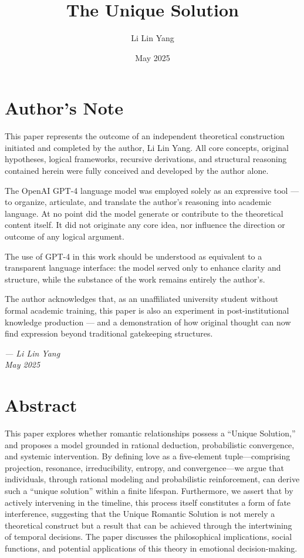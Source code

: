 \documentclass[12pt]{article}
\begin{document}
\title{The Unique Solution}
\author{Li Lin Yang}
\date{May 2025}
\maketitle

\section*{Author’s Note}

This paper represents the outcome of an independent theoretical construction initiated and completed by the author, Li Lin Yang. All core concepts, original hypotheses, logical frameworks, recursive derivations, and structural reasoning contained herein were fully conceived and developed by the author alone.

The OpenAI GPT-4 language model was employed solely as an expressive tool — to organize, articulate, and translate the author's reasoning into academic language. At no point did the model generate or contribute to the theoretical content itself. It did not originate any core idea, nor influence the direction or outcome of any logical argument.

The use of GPT-4 in this work should be understood as equivalent to a transparent language interface: the model served only to enhance clarity and structure, while the substance of the work remains entirely the author’s.

The author acknowledges that, as an unaffiliated university student without formal academic training, this paper is also an experiment in post-institutional knowledge production — and a demonstration of how original thought can now find expression beyond traditional gatekeeping structures.

\bigskip
\noindent\textit{--- Li Lin Yang} \\
\textit{May 2025}

\newpage

\section*{Abstract}

This paper explores whether romantic relationships possess a “Unique Solution,” and proposes a model grounded in rational deduction, probabilistic convergence, and systemic intervention. By defining love as a five-element tuple—comprising projection, resonance, irreducibility, entropy, and convergence—we argue that individuals, through rational modeling and probabilistic reinforcement, can derive such a “unique solution” within a finite lifespan. Furthermore, we assert that by actively intervening in the timeline, this process itself constitutes a form of fate interference, suggesting that the Unique Romantic Solution is not merely a theoretical construct but a result that can be achieved through the intertwining of temporal decisions. The paper discusses the philosophical implications, social functions, and potential applications of this theory in emotional decision-making.
\end{document}
